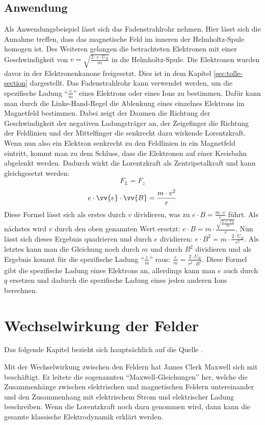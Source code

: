 \subsection{Anwendung}
\label{sec:Fadenstrahlrohr}
Als Anwendungsbeispiel lässt sich das Fadenstrahlrohr nehmen.
Hier lässt sich die Annahme treffen, dass das magnetische Feld im inneren der Helmholtz-Spule homogen ist. Des Weiteren gelangen die betrachteten Elektronen mit einer Geschwindigkeit von $v=\sqrt{\frac{2 \cdot e \cdot U_B}{m}}$ in die Helmholtz-Spule.
Die Elektronen wurden davor in der Elektronenkanone freigesetzt.
Dies ist in dem Kapitel \ref{sec:tolle-section} dargestellt. 
Das Fadenstrahlrohr kann verwendet werden, um die spezifische Ladung "`$\frac{e}{m}$"' eines Elektrons oder eines Ions zu bestimmen.
Dafür kann man durch die Linke-Hand-Regel die Ablenkung eines einzelnes Elektrons im Magnetfeld bestimmen.
Dabei zeigt der Daumen die Richtung der Geschwindigkeit der negativen Ladungsträger an, der Zeigefinger die Richtung der Feldlinien und der Mittelfinger die senkrecht dazu wirkende Lorentzkraft.
Wenn nun also ein Elektron senkrecht zu den Feldlinien in ein Magnetfeld eintritt, kommt man zu dem Schluss, dass die Elektronen auf einer Kreisbahn abgelenkt werden. 
Dadurch wirkt die Lorentzkraft als Zentripetalkraft und kann gleichgesetzt werden:
$$F_L = F_z$$
$$e \cdot \vv{v} \cdot \vv{B} = \frac{m \cdot v^2}{r}$$
Diese Formel lässt sich als erstes durch $v$ dividieren, was zu $e \cdot B = \frac{m \cdot v}{r}$ führt.
Als nächstes wird $v$ durch den oben genannten Wert %
ersetzt: $e \cdot B = m \cdot \frac{\sqrt{\frac{2 \cdot e \cdot U_B}{m}}}{r}$.
Nun lässt sich dieses Ergebnis quadrieren und durch $e$ dividieren: $e \cdot B^2 = m \cdot \frac{2 \cdot U_B}{r^2}$.
Als letztes kann man die Gleichung noch durch $m$ und durch $B^2$ dividieren und als Ergebnis kommt für die spezifische Ladung "`$\frac{e}{m}$"' raus: $\frac{e}{m} = \frac{2 \cdot U_B}{ r^2 \cdot B^2}$.
Diese Formel gibt die spezifische Ladung eines Elektrons an, allerdings kann man $e$ auch durch $q$ ersetzen und dadurch die spezifische Ladung eines jeden anderen Ions berechnen.
\section{Wechselwirkung der Felder}%
\label{sec:Maxwell}
Das folgende Kapitel bezieht sich hauptsächlich auf die Quelle \cite{Maxwell}.

Mit der Wechselwirkung zwischen den Feldern hat James Clerk Maxwell sich mit beschäftigt.
Er leitete die sogenannten "`Maxwell-Gleichungen"' her, welche die Zusammenhänge zwischen elektrischen und magnetischen Feldern untereinander und den Zusammenhang mit elektrischem Strom und elektrischer Ladung beschreiben.
Wenn die Lorentzkraft noch dazu genommen wird, dann kann die gesamte klassische Elektrodynamik erklärt werden.

